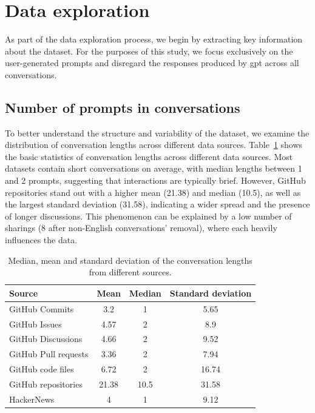 \section{Data exploration}
As part of the data exploration process, we begin by extracting key information about the dataset. For the purposes of this study, we focus exclusively on the user-generated prompts and disregard the responses produced by \acrshort{gpt} across all conversations. 

\subsection{Number of prompts in conversations}
To better understand the structure and variability of the dataset, we examine the distribution of conversation lengths across different data sources. Table~\ref{table:conv-lengths} shows the basic statistics of conversation lengths across different data sources. Most datasets contain short conversations on average, with median lengths between 1 and 2 prompts, suggesting that interactions are typically brief. However, GitHub repositories stand out with a higher mean (21.38) and median (10.5), as well as the largest standard deviation (31.58), indicating a wider spread and the presence of longer discussions. This phenomenon can be explained by a low number of sharings (8 after non-English conversations' removal), where each heavily influences the data.

\begin{table}[H]
\centering
\begin{tabular}{|l||c|c|c|}
\hline
Source           & Mean & Median & Standard deviation \\ 
\hline
GitHub Commits       & 3.2   & 1     & 5.65               \\
\hline
GitHub Issues        & 4.57  & 2     & 8.9                \\
\hline
GitHub Discussions   & 4.66  & 2     & 9.52               \\
\hline
GitHub Pull requests & 3.36  & 2     & 7.94               \\
\hline
GitHub code files    & 6.72  & 2     & 16.74              \\
\hline
GitHub repositories  & 21.38 & 10.5  & 31.58              \\
\hline
HackerNews       & 4     & 1     & 9.12               \\
\hline 
\end{tabular}   
\caption{Median, mean and standard deviation of the conversation lengths from different sources.}
\label{table:conv-lengths} 
\end{table}


